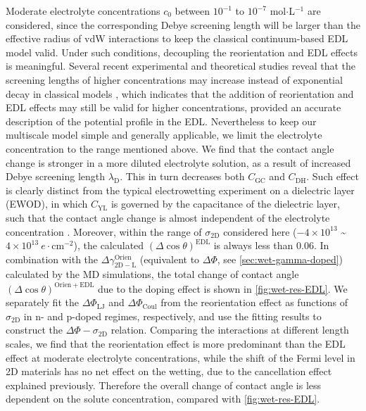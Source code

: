 Moderate electrolyte
concentrations \(c_{0}\) between \(10^{-1}\) to \(10^{-7}\)
mol\(\cdot\)L\(^{-1}\) are considered, since the corresponding Debye
screening length will be larger than the effective radius of vdW
interactions to keep the classical continuum-based EDL model valid.
Under such conditions, decoupling the reorientation and EDL effects is
meaningful.
%
Several recent experimental and theoretical studies reveal that
the screening lengths of higher concentrations may increase instead of
exponential decay in classical models
\cite{Smith_2016_screening,Lee_2017_scaling}, which indicates that the
addition of reorientation and EDL effects may still be valid for
higher concentrations, provided an accurate description of the
potential profile in the EDL. Nevertheless to keep our multiscale
model simple and generally applicable, we limit the electrolyte
concentration to the range mentioned above.
We find that the contact angle change is stronger in a
more diluted electrolyte solution, as a result of  increased Debye
screening length \(\lambda_{\mathrm{D}}\). This in turn decreases
both \(C_{\mathrm{GC}}\) and \(C_{\mathrm{DH}}\).
%
Such effect is clearly distinct from the typical electrowetting
experiment on a dielectric layer (EWOD), in
which \(C_{\mathrm{YL}}\) is governed by the capacitance of the
dielectric layer, such that the contact angle change is almost independent of
the electrolyte concentration \cite{Mugele_2005_EW_rev}.
%
Moreover, within the range of \(\sigma_{\mathrm{2D}}\) considered here
(\(-4\times10^{13}\) \textasciitilde{}
\(4\times10^{13}\ e\cdot \mathrm{cm}^{-2}\)), the calculated
\((\Delta \cos \theta)^{\mathrm{EDL}}\) is always less than 0.06.  In
combination with the
\(\Delta \gamma^{\mathrm{Orien}}_{\mathrm{2D-L}}\) (equivalent to
\(\Delta \Phi\), see \autoref{sec:wet-gamma-doped}) calculated by the
MD simulations, the total change of contact angle
\((\Delta \cos \theta)^{\mathrm{Orien + EDL}}\) due to the doping
effect is shown in \autoref{fig:wet-res-EDL}. We separately fit the
\(\Delta \Phi_{\mathrm{LJ}}\) and \(\Delta \Phi_{\mathrm{Coul}}\) from
the reorientation effect as functions of \(\sigma_{\mathrm{2D}}\) in
n- and p-doped regimes, respectively, and use the fitting results to
construct the \(\Delta \Phi-\sigma_{\mathrm{2D}}\) relation. Comparing
the interactions at different length scales, we find that the
reorientation effect is more predominant than the EDL effect at
moderate electrolyte concentrations, while the shift of the Fermi
level in 2D materials has no net effect on the wetting, due to the
cancellation effect explained previously. Therefore the overall change
of contact angle is less dependent on the solute concentration,
compared with \autoref{fig:wet-res-EDL}.

